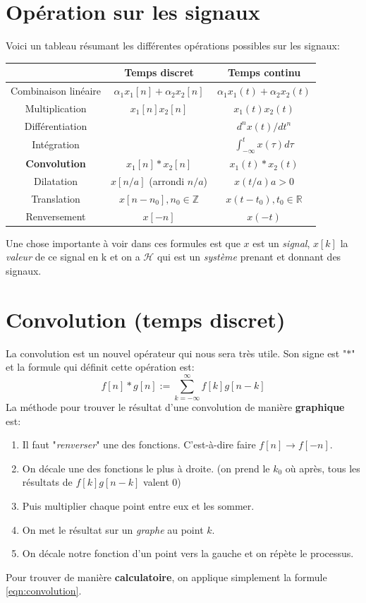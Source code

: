 \documentclass{report}
\begin{document}
\section{Opération sur les signaux}
Voici un tableau résumant les différentes opérations possibles sur les signaux:
\begin{center}
\begin{tabular}{|c|c|c|}
	\hline
	 & Temps discret & Temps continu\\
	\hline
	Combinaison linéaire & $\alpha_1 x_1[n] + \alpha_2 x_2[n]$ & $\alpha_1 x_1(t) + \alpha_2 x_2(t)$\\
	\hline
	Multiplication & $x_1[n]x_2[n]$ & $x_1(t)x_2(t)$\\
	\hline
	Différentiation &  & $d^nx(t)/dt^n$\\
	\hline
	Intégration &  & $\int_{-\infty}^t x(\tau)d\tau$\\
	\hline
	\textbf{Convolution} & $x_1[n] \ast x_2[n]$ & $x_1(t) \ast x_2(t)$\\
	\hline
	Dilatation & $x[n/a]$ (arrondi $n/a$) & $x(t/a) a>0$\\
	\hline
	Translation & $x[n-n_0], n_0 \in \mathbb{Z}$ & $x(t-t_0), t_0 \in \mathbb{R}$\\
	\hline
	Renversement & $x[-n]$ & $x(-t)$\\
	\hline
\end{tabular}
\end{center}
Une chose importante à voir dans ces formules est que $x$ est un \textit{signal}, $x[k]$ la \textit{valeur} de ce signal en k et on a $\mathcal{H}$ qui est un \textit{système} prenant et donnant des signaux.

\section{Convolution (temps discret)} \label{convo}
La convolution est un nouvel opérateur qui nous sera très utile. Son signe est "$\ast$" et la formule qui définit cette opération est:
\begin{equation} \label{eqn:convolution}
f[n] \ast g[n] := \sum_{k=-\infty}^{\infty} f[k]g[n-k] 
\end{equation}
La méthode pour trouver le résultat d'une convolution de manière \textbf{graphique} est:
\begin{enumerate}
\item Il faut "\textit{renverser}" une des fonctions. C'est-à-dire faire $f[n] \rightarrow f[-n]$.
\item On décale une des fonctions le plus à droite. (on prend le $k_0$ où après, tous les résultats de $f[k]g[n-k]$ valent $0$) 
\item Puis multiplier chaque point entre eux et les sommer.
\item On met le résultat sur un \textit{graphe} au point $k$.
\item On décale notre fonction d'un point vers la gauche et on répète le processus.
\end{enumerate}
Pour trouver de manière \textbf{calculatoire}, on applique simplement la formule \ref{eqn:convolution}.
\end{document}
